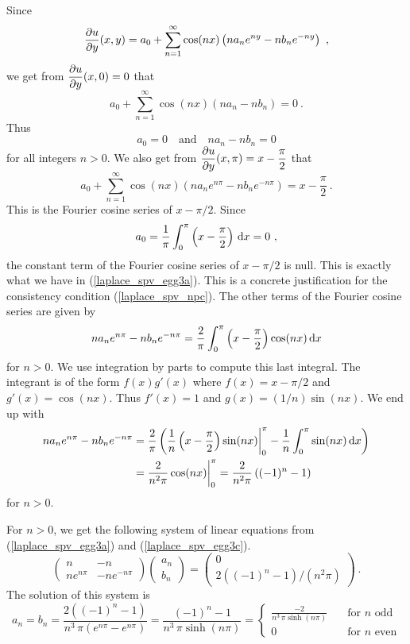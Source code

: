 \begin{egg}
Since
\[
\frac{\partial{u}}{\partial y}(x,y) =  a_0
+ \sum_{n=1}^\infty \cos(n x)\left(n a_n e^{n y} -n b_n e^{-n y}\right) \ ,
\]
we get from $\displaystyle \frac{\partial{u}}{\partial y}(x,0) = 0$ that
\[
a_0 + \sum_{n=1}^\infty \cos(n x)\left(n a_n -n b_n\right) = 0 \  .
\]
Thus
\begin{equation} \label{laplace_spv_egg3a}
a_0 = 0 \quad \text{and} \quad n a_n - n b_n = 0
\end{equation}
for all integers $n>0$.
We also get from $\displaystyle \frac{\partial{u}}{\partial y}(x,\pi) = x - \frac{\pi}{2}$ that
\[
a_0 +
\sum_{n=1}^\infty \cos(n x)\left(n a_n e^{n \pi} -n b_n e^{-n \pi}\right)
= x - \frac{\pi}{2} \ .
\]
This is the Fourier cosine series of $\displaystyle x -\pi/2$.
Since
\[
a_0 = \frac{1}{\pi} \int_0^\pi \left( x - \frac{\pi}{2} \right) \,\mathrm{d}{x} = 0 \  ,
\]
the constant term of the Fourier cosine series of
$\displaystyle x - \pi/2$ is null.  This is exactly what we
have in (\ref{laplace_spv_egg3a}).  This is a concrete justification
for the consistency condition (\ref{laplace_spv_npc}).
The other terms of the Fourier cosine series are given by
\[
n a_n e^{n \pi} -n b_n e^{-n \pi}
= \frac{2}{\pi} \int_0^\pi \left( x -\frac{\pi}{2} \right) \cos(n x)
\,\mathrm{d}{x}
\]
for $n> 0$.
We use integration by parts to compute this last integral.
The integrant is of the form $f(x)g'(x)$ where
$\displaystyle f(x) = x - \pi/2$ and
$g'(x) = \cos(n x)$.  Thus $f'(x) = 1$ and
$\displaystyle g(x) = (1/n) \sin(nx)$.  We end up with
\begin{align}
n a_n e^{n \pi} -n b_n e^{-n \pi}
&= \frac{2}{\pi} \left(\frac{1}{n}\left(x -\frac{\pi}{2}\right)
  \sin(nx)\bigg|_0^\pi - \frac{1}{n}\int_0^\pi \sin(nx) \,\mathrm{d}{x} \right)
\nonumber \\
&= \frac{2}{n^2\pi} \cos(nx)\bigg|_0^\pi
= \frac{2}{n^2\pi} \left( (-1)^n-1\right) \label{laplace_spv_egg3c}
\end{align}
for $n>0$.

For $n>0$, we get the following system of linear equations from
(\ref{laplace_spv_egg3a}) and (\ref{laplace_spv_egg3c}).
\[
\begin{pmatrix}
n & -n \\ n e^{n \pi} & -n e^{-n \pi}
\end{pmatrix}
\begin{pmatrix}
a_n \\ b_n
\end{pmatrix}
=
\begin{pmatrix}
0 \\ 2\left( (-1)^n-1\right)/(n^2\pi)
\end{pmatrix}
\ .
\]
The solution of this system is
\[
a_n = b_n = \frac{2\left( (-1)^n-1\right)}{n^3\,\pi(e^{n\pi} - e^{n\pi})}
= \frac{ (-1)^n-1}{n^3\,\pi \sinh(n\pi)}
=
\begin{cases}
\displaystyle \frac{-2}{n^3\,\pi \sinh(n\pi)} & \quad \text{for $n$ odd} \\
0 & \quad \text{for $n$ even}
\end{cases}
\]


\end{egg}
